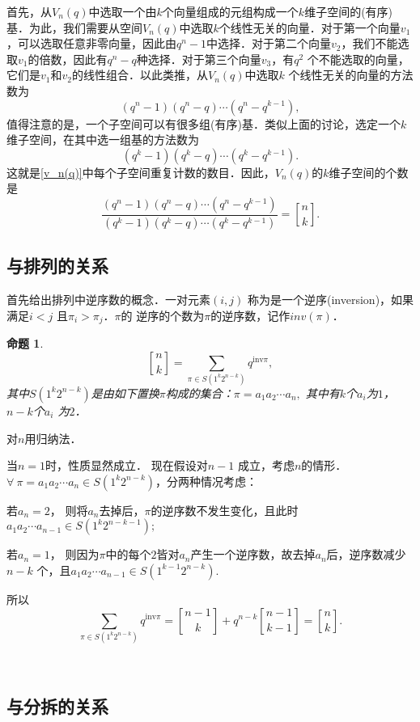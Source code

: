 \documentclass[a4paper,12pt]{ctexart}
\newtheorem{prop}{命题}[section]
\begin{document}
\begin{pf}
首先，从$V_n(q)$中选取一个由$k$个向量组成的元组构成一个$k$维子空间的(有序)基．为此，我们需要从空间$V_n(q)$中选取$k$个线性无关的向量．对于第一个向量$v_1$，可以选取任意非零向量，因此由$q^n-1$中选择．对于第二个向量$v_2$，我们不能选取$v_1$的倍数，因此有$q^n-q$种选择．对于第三个向量$v_3$，有$q^2$ 个不能选取的向量，它们是$v_1$和$v_2$的线性组合．以此类推，从$V_n(q)$中选取$k$ 个线性无关的向量的方法数为
\begin{equation}\label{v_n(q)}
(q^n-1)(q^n-q)\cdots(q^n-q^{k-1}),
\end{equation}
值得注意的是，一个子空间可以有很多组(有序)基．类似上面的讨论，选定一个$k$ 维子空间，在其中选一组基的方法数为
$$(q^k-1)(q^k-q)\cdots(q^k-q^{k-1}).$$
这就是\eqref{v_n(q)}中每个子空间重复计数的数目．因此，$V_n(q)$的$k$维子空间的个数是
$$\frac{(q^n-1)(q^n-q)\cdots(q^n-q^{k-1})}{(q^k-1)(q^k-q)\cdots(q^k-q^{k-1})}={n\brack k}.$$
\end{pf}

\subsection{与排列的关系}

首先给出排列中逆序数的概念．一对元素$(i,j)$ 称为是一个{逆序}(inversion)，如果满足$i<j$ 且$\pi_i>\pi_j$．$\pi$的
逆序的个数为$\pi$的逆序数，记作$inv(\pi)$．

\begin{prop}
$${n\brack k}=\sum_{\pi\in S(1^k2^{n-k})}q^{\mathrm{inv} \pi},$$
其中$S(1^k2^{n-k})$是由如下置换$\pi$构成的集合：$\pi=a_1a_2\cdots
a_n,$ 其中有$k$个$a_i$为$1$，$n-k$个$a_i$ 为$2$．
\end{prop}
\begin{pf}
对$n$用归纳法．

当$n=1$时，性质显然成立． 现在假设对$n-1$ 成立，考虑$n$的情形．
$\forall\ \pi=a_1a_2\cdots a_n\in S(1^k2^{n-k})$，分两种情况考虑：

若$a_n=2$，
则将$a_n$去掉后，$\pi$的逆序数不发生变化，且此时$a_1a_2\cdots
a_{n-1}\in S(1^k2^{n-k-1});$

若$a_n=1$，
则因为$\pi$中的每个$2$皆对$a_n$产生一个逆序数，故去掉$a_n$后，逆序数减少$n-k$ 个，且$a_1a_2\cdots
a_{n-1}\in S(1^{k-1}2^{n-k}).$

所以
$$ \sum_{\pi\in
S(1^k2^{n-k})}q^{\mathrm{inv} \pi}={n-1\brack
k}+q^{n-k}{n-1\brack{k-1}}={n\brack k}.$$
\end{pf}\\[15pt]
\subsection{与分拆的关系}
\end{document}
